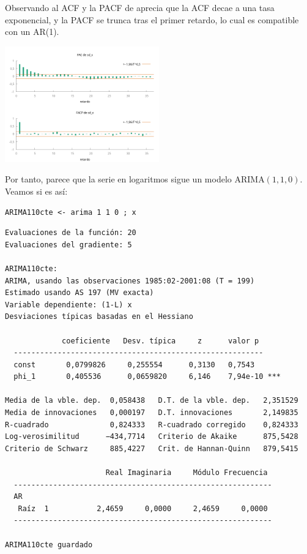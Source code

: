 \documentclass[10pt]{article}
\begin{document}
Observando al ACF y la PACF de aprecia que la ACF decae a una tasa
exponencial, y la PACF se trunca tras el primer retardo, lo cual es
compatible con un AR(1).

\begin{center}
\includegraphics[width=0.5\textwidth]{./SegundoEjercicioIdentificacionModeloARIMA/sd_x_ACF-PACF.png}
\end{center}

Por tanto, parece que la serie en logaritmos sigue un modelo
ARIMA\((1,1,0)\). Veamos si es así:

\begin{verbatim}
ARIMA110cte <- arima 1 1 0 ; x 
\end{verbatim}

\begin{verbatim}
Evaluaciones de la función: 20
Evaluaciones del gradiente: 5

ARIMA110cte:
ARIMA, usando las observaciones 1985:02-2001:08 (T = 199)
Estimado usando AS 197 (MV exacta)
Variable dependiente: (1-L) x
Desviaciones típicas basadas en el Hessiano

             coeficiente   Desv. típica     z      valor p 
  ---------------------------------------------------------
  const       0,0799826     0,255554      0,3130   0,7543  
  phi_1       0,405536      0,0659820     6,146    7,94e-10 ***

Media de la vble. dep.  0,058438   D.T. de la vble. dep.   2,351529
Media de innovaciones   0,000197   D.T. innovaciones       2,149835
R-cuadrado              0,824333   R-cuadrado corregido    0,824333
Log-verosimilitud      −434,7714   Criterio de Akaike      875,5428
Criterio de Schwarz     885,4227   Crit. de Hannan-Quinn   879,5415

                       Real Imaginaria     Módulo Frecuencia
  -----------------------------------------------------------
  AR
   Raíz  1           2,4659     0,0000     2,4659     0,0000
  -----------------------------------------------------------

ARIMA110cte guardado
\end{verbatim}
\end{document}
